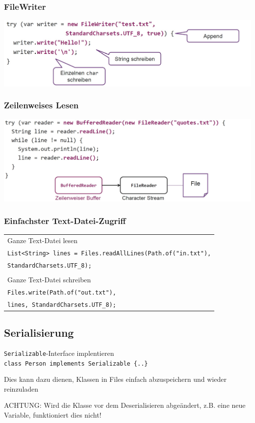 \subsubsection{FileWriter}
\includegraphics[width=0.9\linewidth]{pictures/filewriter.jpg}

\subsubsection{Zeilenweises Lesen}
\includegraphics[width=0.9\linewidth]{pictures/zeilenweise.jpg}

\subsubsection{Einfachster Text-Datei-Zugriff}
\begin{tabular}{l}
    Ganze Text-Datei lesen \\
    \verb|List<String> lines = Files|\verb|.readAllLines(Path.of("in.txt"),| \\
    \verb|StandardCharsets.UTF_8);| \\
    \\
    Ganze Text-Datei schreiben \\
    \verb|Files.write(Path.of("out.txt"),| \\
    \verb|lines, StandardCharsets.UTF_8);| \\
\end{tabular}

\subsection{Serialisierung}
\verb|Serializable|-Interface implentieren\\
\verb|class Person implements Serializable {..}|

Dies kann dazu dienen, Klassen in Files einfach abzuspeichern und wieder reinzuladen



ACHTUNG: Wird die Klasse vor dem Deserialisieren abgeändert, z.B. eine neue Variable, funktioniert dies nicht!